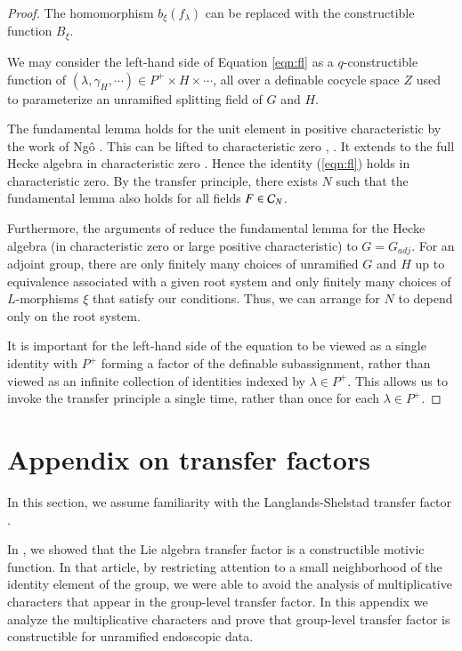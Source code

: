 \begin{proof}
The homomorphism $b_\xi(f_\lambda)$ can be replaced with
the constructible function $B_\xi$.

We may consider the left-hand side of Equation \ref{eqn:fl} as a
$q$-constructible function of $(\lambda,\gamma_H,\cdots)\in P^+\times
H\times\cdots$, all over a definable cocycle space $Z$ used to
parameterize an unramified splitting field of $G$ and $H$.

The fundamental lemma holds for the unit element in positive
characteristic by the work of Ng\^o \cite{ngo2010lemme}.  This can be
lifted to characteristic zero \cite{cluckers2011transfer},
\cite{waldspurger2006endoscopie}.  It extends to the full Hecke
algebra in characteristic zero \cite{hales1995fundamental}.  Hence the
identity (\ref{eqn:fl}) holds in characteristic zero.  By the transfer
principle, there exists $N$ such that the fundamental lemma also holds
for all fields $F\in\mathcal C_N$.

Furthermore, the arguments of \cite{hales1995fundamental} reduce the
fundamental lemma for the Hecke algebra (in characteristic zero or
large positive characteristic) to $G = G_{adj}$.  For an adjoint
group, there are only finitely many choices of unramified $G$ and $H$
up to equivalence associated with a given root system and only
finitely many choices of $L$-morphisms $\xi$ that satisfy our
conditions.  Thus, we can arrange for $N$ to depend only on the root
system.

It is important for the left-hand side of the equation to be viewed as
a single identity with $P^+$ forming a factor of the definable
subassignment, rather than viewed as an infinite collection of
identities indexed by $\lambda\in P^+$.  This allows us to invoke the
transfer principle a single time, rather than once for each
$\lambda\in P^+$.
\end{proof}

\section{Appendix on transfer factors}\label{sec:xfer}

In this section, we assume familiarity with the Langlands-Shelstad
transfer factor \cite{langlands1987definition}.

In \cite{gordon}, we showed that the Lie algebra transfer factor is a
constructible motivic function.  In that article, by restricting
attention to a small neighborhood of the identity element of the
group, we were able to avoid the analysis of multiplicative characters
that appear in the group-level transfer factor.  In this appendix we
analyze the multiplicative characters and prove that group-level
transfer factor is constructible for unramified endoscopic data.

